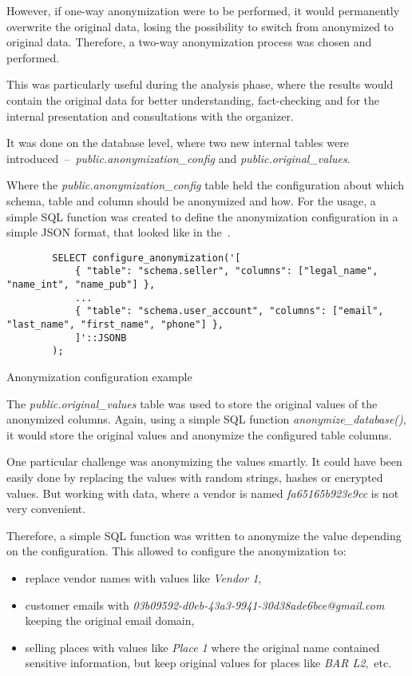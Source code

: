 However, if one-way anonymization were to be performed, it would permanently overwrite the original data, losing the possibility to switch from anonymized to original data.
Therefore, a two-way anonymization process was chosen and performed.

This was particularly useful during the analysis phase, where the results would contain the original data for better understanding, fact-checking and for the internal presentation and consultations with the organizer.

It was done on the database level, where two new internal tables were introduced~–~\textit{public.anonymization\_config} and \textit{public.original\_values}.

Where the \textit{public.anonymization\_config} table held the configuration about which schema, table and column should be anonymized and how.
For the usage, a simple SQL function was created to define the anonymization configuration in a simple JSON format, that looked like in the~.

\begin{listing}[H]
	\begin{verbatim}
		SELECT configure_anonymization('[
			{ "table": "schema.seller", "columns": ["legal_name", "name_int", "name_pub"] },
			...
			{ "table": "schema.user_account", "columns": ["email", "last_name", "first_name", "phone"] },
			]'::JSONB
		);
	\end{verbatim}
	\caption{Anonymization configuration example}
	\label{lst:anonymization-configuration}
\end{listing}

The \textit{public.original\_values} table was used to store the original values of the anonymized columns.
Again, using a simple SQL function \textit{anonymize\_database()}, it would store the original values and anonymize the configured table columns.

One particular challenge was anonymizing the values smartly.
It could have been easily done by replacing the values with random strings, hashes or encrypted values.
But working with data, where a vendor is named \textit{fa65165b923e9cc} is not very convenient.

Therefore, a simple SQL function was written to anonymize the value depending on the configuration.
This allowed to configure the anonymization to:
\begin{itemize}
	\item replace vendor names with values like \textit{Vendor 1},
	\item customer emails with \textit{03b09592-d0eb-43a3-9941-30d38ade6bce@gmail.com} keeping the original email domain,
	\item selling places with values like \textit{Place 1} where the original name contained sensitive information, but keep original values for places like \textit{BAR L2},~etc.
\end{itemize}

